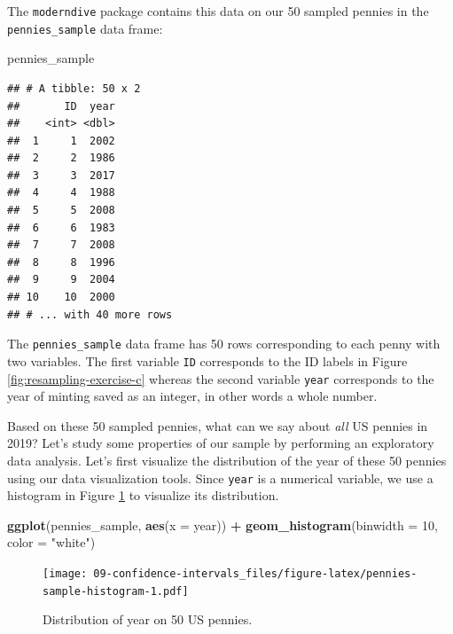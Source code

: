 \documentclass[
]{book}
\newenvironment{Shaded}{\begin{snugshade}}{\end{snugshade}}
\newcommand{\DataTypeTok}[1]{\textcolor[rgb]{0.13,0.29,0.53}{#1}}
\newcommand{\DecValTok}[1]{\textcolor[rgb]{0.00,0.00,0.81}{#1}}
\newcommand{\KeywordTok}[1]{\textcolor[rgb]{0.13,0.29,0.53}{\textbf{#1}}}
\newcommand{\NormalTok}[1]{#1}
\newcommand{\OperatorTok}[1]{\textcolor[rgb]{0.81,0.36,0.00}{\textbf{#1}}}
\newcommand{\StringTok}[1]{\textcolor[rgb]{0.31,0.60,0.02}{#1}}
\begin{document}
The \texttt{moderndive}  package contains this data on our 50 sampled pennies in the \texttt{pennies\_sample} data frame:

\begin{Shaded}
\begin{Highlighting}[]
\NormalTok{pennies_sample}
\end{Highlighting}
\end{Shaded}

\begin{verbatim}
## # A tibble: 50 x 2
##       ID  year
##    <int> <dbl>
##  1     1  2002
##  2     2  1986
##  3     3  2017
##  4     4  1988
##  5     5  2008
##  6     6  1983
##  7     7  2008
##  8     8  1996
##  9     9  2004
## 10    10  2000
## # ... with 40 more rows
\end{verbatim}

The \texttt{pennies\_sample} data frame has 50 rows corresponding to each penny with two variables. The first variable \texttt{ID} corresponds to the ID labels in Figure \ref{fig:resampling-exercise-c} whereas the second variable \texttt{year} corresponds to the year of minting saved as an integer, in other words a whole number.

Based on these 50 sampled pennies, what can we say about \emph{all} US pennies in 2019? Let's study some properties of our sample by performing an exploratory data analysis. Let's first visualize the distribution of the year of these 50 pennies using our data visualization tools. Since \texttt{year} is a numerical variable, we use a histogram in Figure \ref{fig:pennies-sample-histogram} to visualize its distribution.

\begin{Shaded}
\begin{Highlighting}[]
\KeywordTok{ggplot}\NormalTok{(pennies_sample, }\KeywordTok{aes}\NormalTok{(}\DataTypeTok{x =}\NormalTok{ year)) }\OperatorTok{+}
\StringTok{  }\KeywordTok{geom_histogram}\NormalTok{(}\DataTypeTok{binwidth =} \DecValTok{10}\NormalTok{, }\DataTypeTok{color =} \StringTok{"white"}\NormalTok{)}
\end{Highlighting}
\end{Shaded}

\begin{figure}
\centering
\texttt{[image: 09-confidence-intervals\_files/figure-latex/pennies-sample-histogram-1.pdf]}
\caption{\label{fig:pennies-sample-histogram}Distribution of year on 50 US pennies.}
\end{figure}
\end{document}
